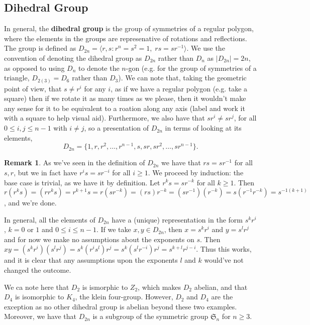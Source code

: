 \documentclass[9pt,reqno]{amsart}
\theoremstyle{definition}
\newtheorem{rem}{Remark}[section]
\begin{document}
\subsection{Dihedral Group} In general, the \textbf{dihedral group} is the group of symmetries of a regular polygon, where the elements in the groups are represenative of rotations and reflections. The group is defined as $D_{2n} = \langle r, s \colon r^n = s^2 =1, \;  rs=sr^{-1}  \rangle$. We use the convention of denoting the dihedral group as $D_{2n}$ rather than $D_n$ as $| D_{2n} | = 2n$, as opposed to using $D_n$ to denote the $n$-gon (e.g. for the group of symmetries of a triangle, $D_{2(3)} = D_6$ rather than $D_3$). We can note that, taking the geometric point of view, that $s \neq r^i$ for any $i$, as if we have a regular polygon (e.g. take a square) then if we rotate it as many times as we please, then it wouldn't make any sense for it to be equivalent to a roation along any axis (label and work it with a square to help visual aid). Furthermore, we also have that $sr^i \neq sr^j$, for all $0 \leq i, j \leq n- 1$ with $i \neq j$, so a presentation of $D_{2n}$ in terms of looking at its elements, $$D_{2n} = \{ 1, r, r^2, \ldots, r^{n-1}, s, sr, sr^2, \ldots, sr^{n-1} \}.$$
\begin{rem}
	As we've seen in the definition of $D_{2n}$ we have that $rs = sr^{-1}$ for all $s, r$, but we in fact have $r^i s = sr^{-i}$ for all $i \geq 1$. We proceed by induction: the base case is trivial, as we have it by definition. Let $r^k s = sr^{-k}$ for all $k \geq 1$. Then $r (r^k s ) = (r r^k s) = r^{k+1} s = r(sr^{-k}) = (rs) r^{-k} = (sr^{-1})(r^{-k}) = s (r^{-1} r^{-k}) = s^{-1(k+1)}$, and we're done. 

In general, all the elements of $D_{2n}$ have a (unique) representation in the form $s^k r^i$, $k= 0$ or $1$ and $0 \leq i \leq n-1$. If we take $x, y \in D_{2n}$, then $x = s^k r^i$ and $y = s^l r^j$ and for now we make no assumptions about the exponents on $s$. Then $xy = (s^k r^i)(s^l r^j) = s^k (r^i s^l) r^j = s^k (s^l r^{-i}) r^j = s^{k+l} r^{j-i}$. Thus this works, and it is clear that any assumptions upon the exponents $l$ and $k$ would've not changed the outcome. 
\end{rem}

We ca note here that $D_2$ is ismorphic to $Z_2$, which makes $D_2$ abelian, and that $D_4$ is isomorphic to $K_4$, the klein four-group. However, $D_2$ and $D_4$ are the exception as no other dihedral group is abelian beyond these two examples. Moreover, we have that $D_{2n}$ is a subgroup of the symmetric group $\mathfrak{S}_n$ for $n \geq 3$. 
\end{document}
